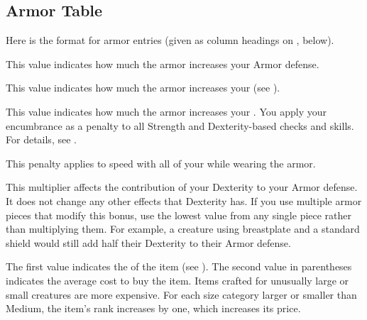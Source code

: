     \subsection{Armor Table}
        \par Here is the format for armor entries (given as column headings on , below).

         This value indicates how much the armor increases your Armor defense.

         This value indicates how much the armor increases your  (see ).

         This value indicates how much the armor increases your .
        You apply your encumbrance as a penalty to all Strength and Dexterity-based checks and skills.
        For details, see .

         This penalty applies to speed with all of your  while wearing the armor.

         This multiplier affects the contribution of your Dexterity to your Armor defense.
        It does not change any other effects that Dexterity has.
        If you use multiple armor pieces that modify this bonus, use the lowest value from any single piece rather than multiplying them.
        For example, a creature using breastplate and a standard shield would still add half their Dexterity to their Armor defense.

         The first value indicates the  of the item (see ).
        The second value in parentheses indicates the average cost to buy the item.
        Items crafted for unusually large or small creatures are more expensive.
        For each size category larger or smaller than Medium, the item's rank increases by one, which increases its price.

